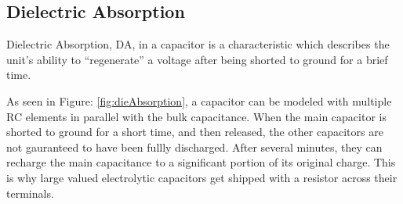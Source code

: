 \subsection{Dielectric Absorption}


Dielectric Absorption, DA, in a capacitor is a characteristic which describes the unit's ability to ``regenerate'' a voltage after being shorted to ground for a brief time.

As seen in Figure: \ref{fig:dieAbsorption}, a capacitor can be modeled with multiple RC elements in parallel with the bulk capacitance. When the main capacitor is shorted to ground for a short time, and then released, the other capacitors are not gauranteed to have been fullly discharged. After several minutes, they can recharge the main capacitance to a significant portion of its original charge. This is why large valued electrolytic capacitors get shipped with a resistor across their terminals.

